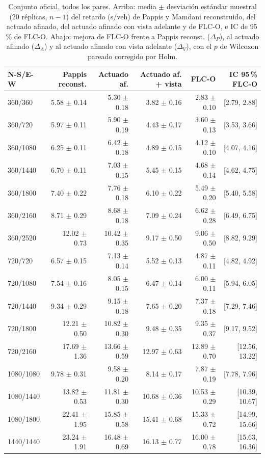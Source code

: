 \begin{table}[!t]
\centering
\caption{Conjunto oficial, todos los pares. Arriba: media $\pm$ desviaci\'on est\'andar muestral (20 r\'eplicas, $n-1$) del retardo (s/veh) de Pappis y Mamdani reconstruido, del actuado afinado, del actuado afinado con vista adelante y de FLC-O, e IC de 95\,\% de FLC-O. Abajo: mejora de FLC-O frente a Pappis reconst. ($\Delta_P$), al actuado afinado ($\Delta_A$) y al actuado afinado con vista adelante ($\Delta_V$), con el $p$ de Wilcoxon pareado corregido por Holm.}
\label{tab:spares}
\scriptsize
\setlength{\tabcolsep}{4pt}
\begin{tabular}{@{}lrrrrr@{}}
\toprule
N-S/E-W & Pappis reconst. & Actuado af. & Actuado af. + vista & FLC-O & IC 95\,\% FLC-O \\
\midrule
360/360 & 5.58 $\pm$ 0.14 & 5.30 $\pm$ 0.18 & 3.82 $\pm$ 0.16 & 2.83 $\pm$ 0.10 & [2.79, 2.88] \\
360/720 & 5.97 $\pm$ 0.11 & 5.90 $\pm$ 0.19 & 4.43 $\pm$ 0.17 & 3.60 $\pm$ 0.13 & [3.53, 3.66] \\
360/1080 & 6.25 $\pm$ 0.11 & 6.42 $\pm$ 0.18 & 4.89 $\pm$ 0.15 & 4.12 $\pm$ 0.10 & [4.07, 4.16] \\
360/1440 & 6.70 $\pm$ 0.11 & 7.03 $\pm$ 0.15 & 5.45 $\pm$ 0.15 & 4.68 $\pm$ 0.14 & [4.62, 4.75] \\
360/1800 & 7.40 $\pm$ 0.22 & 7.76 $\pm$ 0.18 & 6.10 $\pm$ 0.22 & 5.49 $\pm$ 0.20 & [5.40, 5.58] \\
360/2160 & 8.71 $\pm$ 0.29 & 8.68 $\pm$ 0.18 & 7.09 $\pm$ 0.24 & 6.62 $\pm$ 0.28 & [6.49, 6.75] \\
360/2520 & 12.02 $\pm$ 0.73 & 10.42 $\pm$ 0.35 & 9.17 $\pm$ 0.50 & 9.06 $\pm$ 0.50 & [8.82, 9.29] \\
720/720 & 6.57 $\pm$ 0.15 & 7.13 $\pm$ 0.14 & 5.52 $\pm$ 0.13 & 4.87 $\pm$ 0.11 & [4.82, 4.92] \\
720/1080 & 7.54 $\pm$ 0.16 & 8.05 $\pm$ 0.15 & 6.47 $\pm$ 0.14 & 6.00 $\pm$ 0.11 & [5.94, 6.05] \\
720/1440 & 9.34 $\pm$ 0.29 & 9.15 $\pm$ 0.18 & 7.65 $\pm$ 0.20 & 7.37 $\pm$ 0.18 & [7.29, 7.46] \\
720/1800 & 12.21 $\pm$ 0.50 & 10.82 $\pm$ 0.30 & 9.48 $\pm$ 0.35 & 9.35 $\pm$ 0.37 & [9.17, 9.52] \\
720/2160 & 17.69 $\pm$ 1.36 & 13.66 $\pm$ 0.59 & 12.97 $\pm$ 0.63 & 12.89 $\pm$ 0.70 & [12.56, 13.22] \\
1080/1080 & 9.78 $\pm$ 0.31 & 9.58 $\pm$ 0.20 & 8.14 $\pm$ 0.17 & 7.87 $\pm$ 0.19 & [7.78, 7.96] \\
1080/1440 & 13.82 $\pm$ 0.53 & 11.81 $\pm$ 0.30 & 10.68 $\pm$ 0.36 & 10.53 $\pm$ 0.29 & [10.39, 10.67] \\
1080/1800 & 22.41 $\pm$ 1.95 & 15.85 $\pm$ 0.58 & 15.41 $\pm$ 0.68 & 15.33 $\pm$ 0.72 & [14.99, 15.66] \\
1440/1440 & 23.24 $\pm$ 1.91 & 16.48 $\pm$ 0.69 & 16.13 $\pm$ 0.77 & 16.00 $\pm$ 0.78 & [15.63, 16.36] \\
\bottomrule
\end{tabular}


\end{table}
